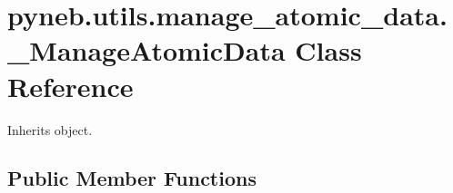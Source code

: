 \hypertarget{classpyneb_1_1utils_1_1manage__atomic__data_1_1___manage_atomic_data}{}\section{pyneb.\+utils.\+manage\+\_\+atomic\+\_\+data.\+\_\+\+Manage\+Atomic\+Data Class Reference}
\label{classpyneb_1_1utils_1_1manage__atomic__data_1_1___manage_atomic_data}


Inherits object.

\subsection*{Public Member Functions}
